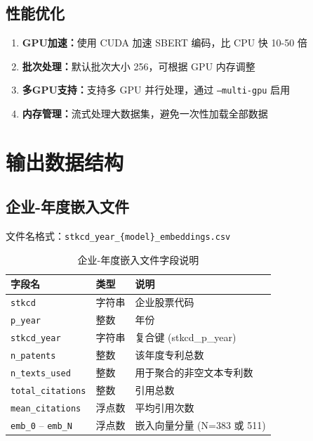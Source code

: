 \documentclass[12pt,a4paper]{article}
\theoremstyle{definition}
\begin{document}
\subsection{性能优化}

\begin{enumerate}
    \item \textbf{GPU加速：}使用 CUDA 加速 SBERT 编码，比 CPU 快 10-50 倍
    \item \textbf{批次处理：}默认批次大小 256，可根据 GPU 内存调整
    \item \textbf{多GPU支持：}支持多 GPU 并行处理，通过 \texttt{--multi-gpu} 启用
    \item \textbf{内存管理：}流式处理大数据集，避免一次性加载全部数据
\end{enumerate}

\section{输出数据结构}

\subsection{企业-年度嵌入文件}

文件名格式：\texttt{stkcd\_year\_\{model\}\_embeddings.csv}

\begin{table}[H]
    \centering
    \caption{企业-年度嵌入文件字段说明}
    \label{tab:output-embeddings}
    \begin{tabular}{@{}llp{7cm}@{}}
        \toprule
        \textbf{字段名} & \textbf{类型} & \textbf{说明} \\
        \midrule
        \texttt{stkcd} & 字符串 & 企业股票代码 \\
        \texttt{p\_year} & 整数 & 年份 \\
        \texttt{stkcd\_year} & 字符串 & 复合键 (stkcd\_p\_year) \\
        \texttt{n\_patents} & 整数 & 该年度专利总数 \\
        \texttt{n\_texts\_used} & 整数 & 用于聚合的非空文本专利数 \\
        \texttt{total\_citations} & 整数 & 引用总数 \\
        \texttt{mean\_citations} & 浮点数 & 平均引用次数 \\
        \texttt{emb\_0} -- \texttt{emb\_N} & 浮点数 & 嵌入向量分量 (N=383 或 511) \\
        \bottomrule
    \end{tabular}
\end{table}
\end{document}
